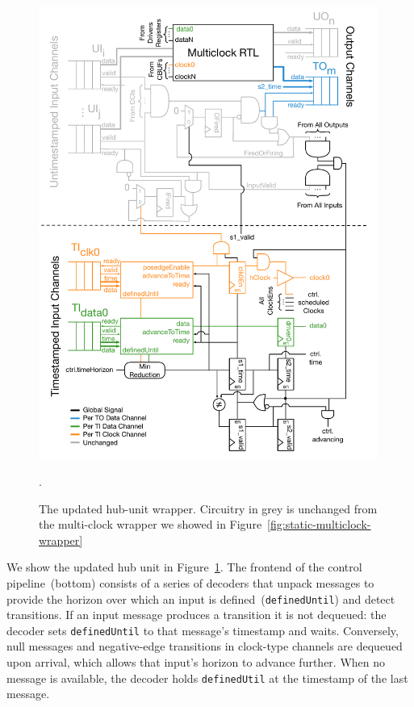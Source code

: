 \begin{figure}
    \centering
    \includegraphics[width=0.99\textwidth]{figures/pdes-wrapper.pdf}
    \caption{The updated hub-unit wrapper. Circuitry in grey is unchanged from the multi-clock
    wrapper we showed in Figure~\ref{fig:static-multiclock-wrapper}}.
    \label{fig:pdes-wrapper}
\end{figure}

We show the updated hub unit in Figure~\ref{fig:pdes-wrapper}. The frontend
of the control pipeline~(bottom) consists of a series of decoders that
unpack messages to provide the horizon over which an input is
defined~(\texttt{definedUntil}) and detect transitions.  If an input message
produces a transition it is not dequeued: the decoder sets
\texttt{definedUntil} to that message's timestamp and waits. Conversely, null
messages and negative-edge transitions in clock-type channels are dequeued
upon arrival, which allows that input's horizon to advance further. When no message is available,
the decoder holds \texttt{definedUtil} at the timestamp of the last message.

